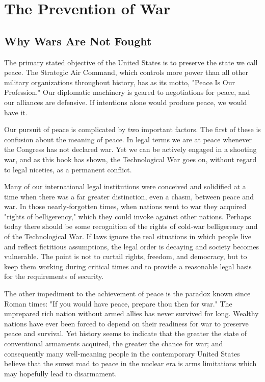 \chapter{The Prevention of War}

\section{Why Wars Are Not Fought}
The primary stated objective of the United States is to preserve the state we call peace. The Strategic Air Command, which controls more power than all other military organizations throughout history, has as its motto, "Peace Is Our Profession." Our diplomatic machinery is geared to negotiations for peace, and our alliances are defensive. If intentions alone would produce peace, we would have it.

Our pursuit of peace is complicated by two important factors. The first of these is confusion about the meaning of peace. In legal terms we are at peace whenever the Congress has not declared war. Yet we can be actively engaged in a shooting war, and as this book has shown, the Technological War goes on, without regard to legal niceties, as a permanent conflict.

Many of our international legal institutions were conceived and solidified at a time when there was a far greater distinction, even a chasm, between peace and war. In those nearly-forgotten times, when nations went to war they acquired "rights of belligerency," which they could invoke against other nations. Perhaps today there should be some recognition of the rights of cold-war belligerency and of the Technological War. If laws ignore the real situations in which people live and reflect fictitious assumptions, the legal order is decaying and society becomes vulnerable. The point is not to curtail rights, freedom, and democracy, but to keep them working during critical times and to provide a reasonable legal basis for the requirements of security.

The other impediment to the achievement of peace is the paradox known since Roman times: "If you would have peace, prepare thou then for war." The unprepared rich nation without armed allies has never survived for long. Wealthy nations have ever been forced to depend on their readiness for war to preserve peace and survival. Yet history seems to indicate that the greater the state of conventional armaments acquired, the greater the chance for war; and consequently many well-meaning people in the contemporary United States believe that the surest road to peace in the nuclear era is arms limitations which may hopefully lead to disarmament.

